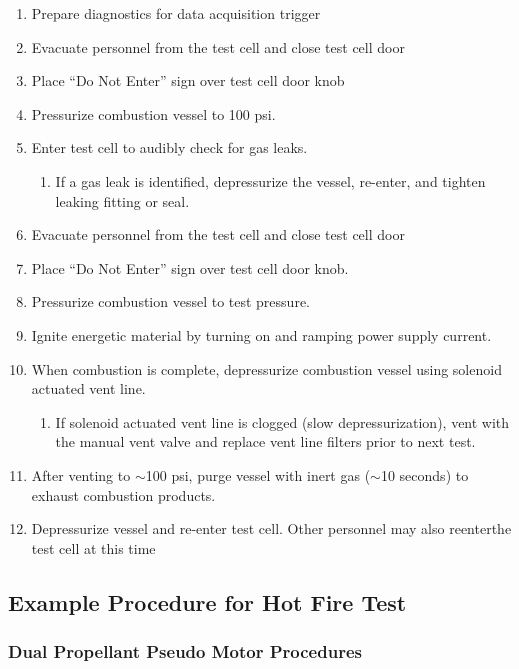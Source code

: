 \begin{enumerate}
    \item Prepare diagnostics for data acquisition trigger
    \item Evacuate personnel from the test cell and close test cell door
    \item Place ``Do Not Enter'' sign over test cell door knob
    \item Pressurize combustion vessel to 100 psi.
    \item Enter test cell to audibly check for gas leaks.
    \begin{enumerate}
        \item If a gas leak is identified, depressurize the vessel, re-enter, and tighten leaking fitting or seal.
    \end{enumerate}
    \item Evacuate personnel from the test cell and close test cell door
    \item Place ``Do Not Enter'' sign over test cell door knob.
    \item Pressurize combustion vessel to test pressure.
    \item Ignite energetic material by turning on and ramping power supply current.
    \item When combustion is complete, depressurize combustion vessel using solenoid actuated vent line.
    \begin{enumerate}
        \item If solenoid actuated vent line is clogged (slow depressurization), vent with the manual vent valve and replace vent line filters prior to next test.
    \end{enumerate}
    \item After venting to \(\sim\)100 psi, purge vessel with inert gas (\(\sim\)10 seconds) to exhaust combustion products.
    \item Depressurize vessel and re-enter test cell. Other personnel may also reenterthe test cell at this time
\end{enumerate}


\subsection{Example Procedure for Hot Fire Test}

\subsubsection*{Dual Propellant Pseudo Motor Procedures}

